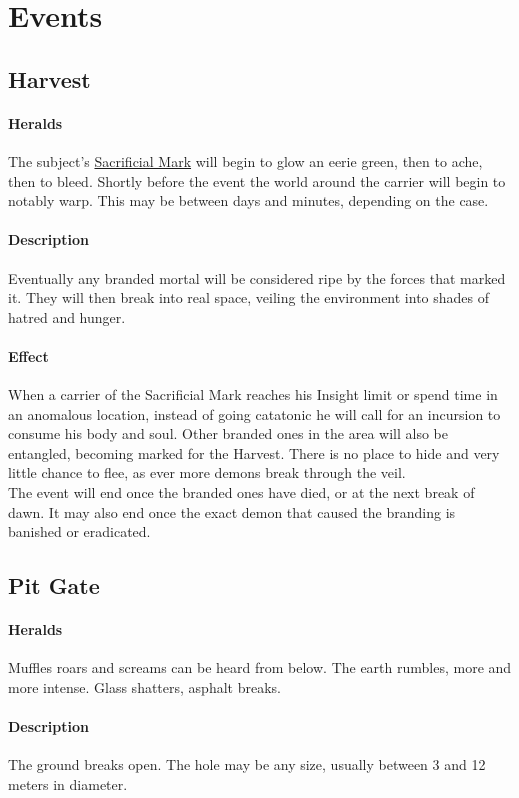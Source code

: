 \section{Events}
\subsection*{Harvest}
\label{anomaly:harvest}
\paragraph{Heralds}
The subject's \hyperref[boon:markofsacrifice]{Sacrificial Mark} will begin to glow an eerie green,
	then to ache,
	then to bleed.
Shortly before the event the world around the carrier will begin to notably warp.
This may be between days and minutes, depending on the case.
\paragraph{Description}
Eventually any branded mortal will be considered ripe by the forces that marked it.
They will then break into real space,
	veiling the environment into shades of hatred and hunger.
\paragraph{Effect}
When a carrier of the Sacrificial Mark reaches his Insight limit
	or spend time in an anomalous location,
	instead of going catatonic he will call for an incursion to consume his body and soul.
Other branded ones in the area will also be entangled,
	becoming marked for the Harvest.
There is no place to hide
	and very little chance to flee,
	as ever more demons break through the veil.
\\%
The event will end once the branded ones have died,
	or at the next break of dawn.
It may also end once the exact demon that caused the branding is banished or eradicated.
\subsection*{Pit Gate}
\paragraph{Heralds}
Muffles roars and screams can be heard from below.
The earth rumbles, more and more intense.
Glass shatters, asphalt breaks.
\paragraph{Description}
The ground breaks open.
The hole may be any size,
	usually between 3 and 12 meters in diameter.
